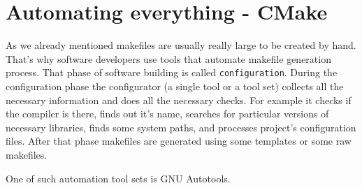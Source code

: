 
\section{Automating everything - CMake}
\label{autotools}

As we already mentioned makefiles are usually really large to be created by hand. That's why software developers use tools that automate makefile generation process. That phase of software building is called {\tt configuration}. During the configuration phase the configurator (a single tool or a tool set) collects all the necessary information and does all the necessary checks. For example it checks if the compiler is there, finds out it's name, searches for particular versions of necessary libraries, finds some system paths, and processes project's configuration files. After that phase makefiles are generated using some templates or some raw makefiles. 

One of such automation tool sets is GNU Autotools.
